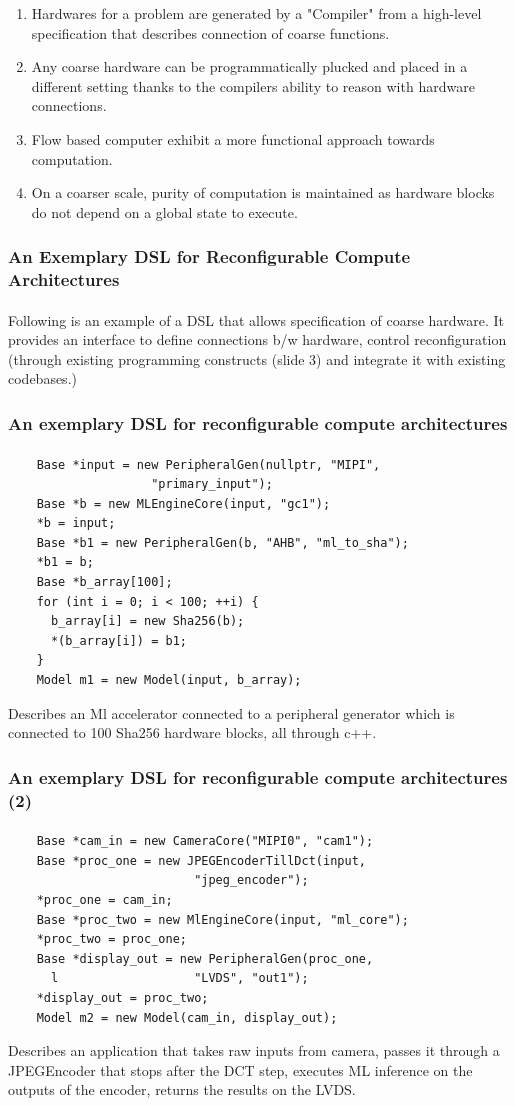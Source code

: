 \documentclass{beamer}
\begin{document}
{\begin{frame}[fragile]
\begin{enumerate}
    \item Hardwares for a problem are generated by a "Compiler" from a high-level
      specification that describes connection of coarse functions.
    \item Any coarse hardware can be programmatically plucked and placed in a
      different setting thanks to the compilers ability to reason with hardware
      connections.
    \item Flow based computer exhibit a more functional approach towards
      computation.
    \item On a coarser scale, purity of computation is maintained as hardware
      blocks do not depend on a global state to execute.
  \end{enumerate}
\end{frame}

\begin{frame}[fragile]
  \frametitle{An Exemplary DSL for Reconfigurable Compute Architectures}
\framesubtitle{}
  Following is an example of a DSL that allows specification of coarse hardware.
  It provides an interface to define connections b/w hardware, control
  reconfiguration (through existing programming constructs (slide 3) and
  integrate it with existing codebases.)

\end{frame}

\begin{frame}[fragile]
  \frametitle{An exemplary DSL for reconfigurable compute architectures}
\framesubtitle{}
  \begin{verbatim}
    Base *input = new PeripheralGen(nullptr, "MIPI", 
                    "primary_input");
    Base *b = new MLEngineCore(input, "gc1");
    *b = input;
    Base *b1 = new PeripheralGen(b, "AHB", "ml_to_sha");
    *b1 = b;
    Base *b_array[100];
    for (int i = 0; i < 100; ++i) {
      b_array[i] = new Sha256(b);
      *(b_array[i]) = b1;
    }
    Model m1 = new Model(input, b_array);
  \end{verbatim}

  Describes an Ml accelerator connected to a peripheral generator
  which is connected to 100 Sha256 hardware blocks, all through c++.
\end{frame}

\begin{frame}[fragile]
  \frametitle{An exemplary DSL for reconfigurable compute architectures (2)}
\framesubtitle{}
  \begin{verbatim}
    Base *cam_in = new CameraCore("MIPI0", "cam1");
    Base *proc_one = new JPEGEncoderTillDct(input, 
                          "jpeg_encoder");
    *proc_one = cam_in;
    Base *proc_two = new MlEngineCore(input, "ml_core");
    *proc_two = proc_one;
    Base *display_out = new PeripheralGen(proc_one, 
      l                   "LVDS", "out1");
    *display_out = proc_two;
    Model m2 = new Model(cam_in, display_out);
  \end{verbatim}
  Describes an application that takes raw inputs from camera, passes it through
  a JPEGEncoder that stops after the DCT step, executes ML inference on the
  outputs of the encoder, returns the results on the LVDS.


\end{frame}}
\end{document}
